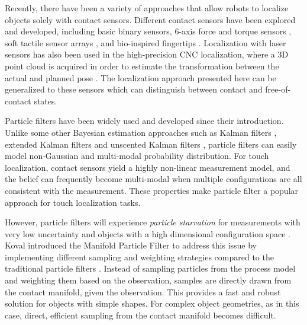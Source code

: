 \documentclass[../thesis.tex]{subfiles}
\begin{document}
%


Recently, there have been a variety of approaches that allow robots to localize objects solely with contact sensors. Different contact sensors have been explored and developed, including basic binary sensors, 6-axis force and torque sensors \cite{del2012control}, soft tactile sensor arrays \cite{hammond2012soft}, and bio-inspired fingertips \cite{fishel2012sensing}. Localization with laser sensors has also been used in the high-precision CNC localization, where a 3D point cloud is acquired in order to estimate the transformation between the actual and planned pose \cite{rajaraman2013automated}.
The localization approach presented here can be generalized to these sensors which can distinguish between contact and free-of-contact states.

Particle filters have been widely used and developed since their introduction. 
Unlike some other Bayesian estimation approaches such as Kalman filters \cite{kalman1960new}, extended Kalman filters \cite{kalman1961new} and unscented Kalman filters \cite{julier1997new}, particle filters can easily model non-Gaussian and multi-modal probability distribution. 
For touch localization, contact sensors yield a highly non-linear measurement model, and the belief can frequently become multi-modal when multiple configurations are all consistent with the measurement. 
These properties make particle filter a popular approach for touch localization tasks. 

However, particle filters will experience \textit{particle starvation} for measurements with very low uncertainty and objects with a high dimensional configuration space \cite{Thrun2000}. 
Koval introduced the Manifold Particle Filter to address this issue by implementing different sampling and weighting strategies compared to the traditional particle filters \cite{Koval2011}\cite{ Koval2013}. 
Instead of sampling particles from the process model and weighting them based on the observation, samples are directly drawn from the contact manifold, given the observation. 
This provides a fast and robust solution for objects with simple shapes. 
For complex object geometries, as in this case, direct, efficient sampling from the contact manifold becomes difficult.
\end{document}
